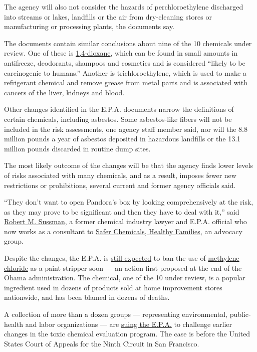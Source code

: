 The agency will also not consider the hazards of perchloroethylene
discharged into streams or lakes, landfills or the air from dry-cleaning
stores or manufacturing or processing plants, the documents say.

The documents contain similar conclusions about nine of the 10 chemicals
under review. One of these is
\href{https://www.epa.gov/assessing-and-managing-chemicals-under-tsca/risk-evaluation-14-dioxane}{1,4-dioxane},
which can be found in small amounts in antifreeze, deodorants, shampoos
and cosmetics and is considered ``likely to be carcinogenic to humans.''
Another is trichloroethylene, which is used to make a refrigerant
chemical and remove grease from metal parts and is
\href{https://www.atsdr.cdc.gov/phs/phs.asp?id=171\&tid=30}{associated
with} cancers of the liver, kidneys and blood.

Other changes identified in the E.P.A. documents narrow the definitions
of certain chemicals, including asbestos. Some asbestos-like fibers will
not be included in the risk assessments, one agency staff member said,
nor will the 8.8 million pounds a year of asbestos deposited in
hazardous landfills or the 13.1 million pounds discarded in routine dump
sites.

The most likely outcome of the changes will be that the agency finds
lower levels of risks associated with many chemicals, and as a result,
imposes fewer new restrictions or prohibitions, several current and
former agency officials said.

``They don't want to open Pandora's box by looking comprehensively at
the risk, as they may prove to be significant and then they have to deal
with it,'' said \href{https://www.lw.com/people/RobertMSussman}{Robert
M. Sussman}, a former chemical industry lawyer and E.P.A. official who
now works as a consultant to \href{https://saferchemicals.org/}{Safer
Chemicals, Healthy Families}, an advocacy group.

Despite the changes, the E.P.A. is
\href{https://www.epa.gov/newsreleases/epa-announces-action-methylene-chloride}{still
expected} to ban the use of
\href{https://www.epa.gov/assessing-and-managing-chemicals-under-tsca/risk-evaluation-methylene-chloride-0}{methylene
chloride} as a paint stripper soon --- an action first proposed at the
end of the Obama administration. The chemical, one of the 10 under
review, is a popular ingredient used in dozens of products sold at home
improvement stores nationwide, and has been blamed in dozens of deaths.

A collection of more than a dozen groups --- representing environmental,
public-health and labor organizations --- are
\href{https://www.edf.org/sites/default/files/Petitioners_Opening_Brief.pdf}{suing
the E.P.A.} to challenge earlier changes in the toxic chemical
evaluation program. The case is before the United States Court of
Appeals for the Ninth Circuit in San Francisco.

